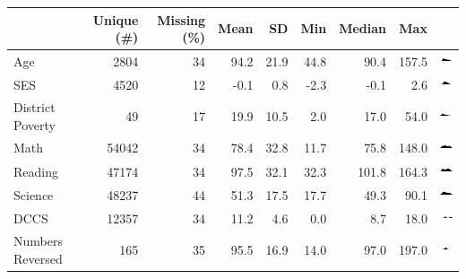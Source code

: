 \documentclass[
]{article}
\begin{document}
\begin{table}
\centering
\begin{tabular}[t]{lrrrrrrr>{}r}
\toprule
  & Unique (\#) & Missing (\%) & Mean & SD & Min & Median & Max &   \\
\midrule
Age & 2804 & 34 & 94.2 & 21.9 & 44.8 & 90.4 & 157.5 & \includegraphics[width=0.67in, height=0.17in]{ECLSKdescriptiveReport_files/figure-latex//hist_736e40ac29f.pdf}\\
SES & 4520 & 12 & -0.1 & 0.8 & -2.3 & -0.1 & 2.6 & \includegraphics[width=0.67in, height=0.17in]{ECLSKdescriptiveReport_files/figure-latex//hist_736e1681597d.pdf}\\
District Poverty & 49 & 17 & 19.9 & 10.5 & 2.0 & 17.0 & 54.0 & \includegraphics[width=0.67in, height=0.17in]{ECLSKdescriptiveReport_files/figure-latex//hist_736e39aaa6ed.pdf}\\
Math & 54042 & 34 & 78.4 & 32.8 & 11.7 & 75.8 & 148.0 & \includegraphics[width=0.67in, height=0.17in]{ECLSKdescriptiveReport_files/figure-latex//hist_736e6980a69b.pdf}\\
Reading & 47174 & 34 & 97.5 & 32.1 & 32.3 & 101.8 & 164.3 & \includegraphics[width=0.67in, height=0.17in]{ECLSKdescriptiveReport_files/figure-latex//hist_736e66462f90.pdf}\\
Science & 48237 & 44 & 51.3 & 17.5 & 17.7 & 49.3 & 90.1 & \includegraphics[width=0.67in, height=0.17in]{ECLSKdescriptiveReport_files/figure-latex//hist_736e6305f7d9.pdf}\\
DCCS & 12357 & 34 & 11.2 & 4.6 & 0.0 & 8.7 & 18.0 & \includegraphics[width=0.67in, height=0.17in]{ECLSKdescriptiveReport_files/figure-latex//hist_736e2e46564b.pdf}\\
Numbers Reversed & 165 & 35 & 95.5 & 16.9 & 14.0 & 97.0 & 197.0 & \includegraphics[width=0.67in, height=0.17in]{ECLSKdescriptiveReport_files/figure-latex//hist_736e2f924a52.pdf}\\

\end{tabular}
\end{table}
\end{document}
